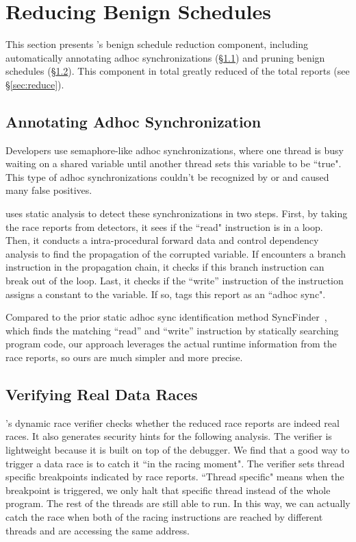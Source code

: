 \section{Reducing Benign Schedules} \label{sec:schedule-reduction}

This section presents \xxx's benign schedule reduction component, 
including automatically annotating adhoc synchronizations 
(\S\ref{sec:adhoc-sync}) and pruning benign schedules 
(\S\ref{sec:verify-race}). This component in total greatly reduced 
\reducerate of the total reports (see \S\ref{sec:reduce}).

\subsection{Annotating Adhoc Synchronization} 
\label{sec:adhoc-sync}
Developers use semaphore-like adhoc synchronizations, where one thread is
busy waiting on a shared variable until another thread sets this variable to be
``true". This type of adhoc synchronizations couldn't be recognized by \tsan or 
\ski and caused many false positives.

\xxx uses static analysis to detect these synchronizations in two steps. First, 
by taking the race reports from detectors, it sees if the ``read" instruction 
is in a loop. Then, it conducts a intra-procedural forward data and control 
dependency analysis to find the propagation of the corrupted variable. If \xxx 
encounters a branch instruction in the propagation chain, it checks if this 
branch instruction can break out of the loop. Last, it checks if the ``write'' 
instruction of the instruction assigns a constant to the variable. If so, \xxx 
tags this report as an ``adhoc sync".

Compared to the prior static adhoc sync identification 
method SyncFinder~\cite{syncfinder:osdi10}, which finds the 
matching ``read'' and ``write'' instruction by statically searching program 
code, our approach leverages the actual runtime information from the race 
reports, so ours are much simpler and more precise.

\subsection{Verifying Real Data Races}\label{sec:verify-race}

\xxx's dynamic race verifier checks whether the reduced race reports 
are indeed real races. It also generates security hints for the 
following analysis. The verifier is lightweight because it is built on top of 
the \lldb debugger. We find that a good way to trigger a data race is to catch 
it ``in the racing moment". The verifier sets thread specific breakpoints 
indicated by \tsan race reports. ``Thread specific" means when the breakpoint 
is triggered, we only halt that specific thread instead of the whole program. 
The rest of the threads are still able to run. In this way, we can actually 
catch the race when both of the racing instructions are reached by different 
threads and are accessing the same address.


